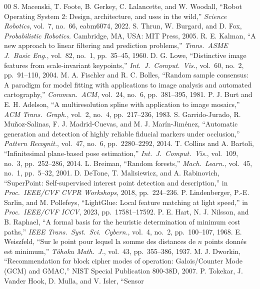 \documentclass[conference]{IEEEtran}
\begin{document}
\begin{thebibliography}{00}
 S. Macenski, T. Foote, B. Gerkey, C. Lalancette, and W. Woodall,
``Robot Operating System 2: Design, architecture, and uses in the wild,''
\emph{Science Robotics}, vol.~7, no.~66, eabm6074, 2022.
 S. Thrun, W. Burgard, and D. Fox, \emph{Probabilistic Robotics}.
Cambridge, MA, USA: MIT Press, 2005.
 R. E. Kalman, ``A new approach to linear filtering and prediction
problems,'' \emph{Trans.\ ASME J.\ Basic Eng.}, vol.~82, no.~1, pp.~35--45, 1960.
 D. G. Lowe, ``Distinctive image features from scale-invariant
keypoints,'' \emph{Int.\ J.\ Comput.\ Vis.}, vol.~60, no.~2, pp.~91--110, 2004.
 M. A. Fischler and R. C. Bolles, ``Random sample consensus: A
paradigm for model fitting with applications to image analysis and automated
cartography,'' \emph{Commun.\ ACM}, vol.~24, no.~6, pp.~381--395, 1981.
 P. J. Burt and E. H. Adelson, ``A multiresolution spline with
application to image mosaics,'' \emph{ACM Trans.\ Graph.}, vol.~2, no.~4,
pp.~217--236, 1983.
 S. Garrido-Jurado, R. Mu\~noz-Salinas, F. J. Madrid-Cuevas, and
M. J. Mar\'in-Jim\'enez, ``Automatic generation and detection of highly reliable
fiducial markers under occlusion,'' \emph{Pattern Recognit.}, vol.~47, no.~6,
pp.~2280--2292, 2014.
 T. Collins and A. Bartoli, ``Infinitesimal plane-based pose
estimation,'' \emph{Int.\ J.\ Comput.\ Vis.}, vol.~109, no.~3, pp.~252--286, 2014.
 L. Breiman, ``Random forests,'' \emph{Mach.\ Learn.}, vol.~45,
no.~1, pp.~5--32, 2001.
 D. DeTone, T. Malisiewicz, and A. Rabinovich, ``SuperPoint:
Self-supervised interest point detection and description,'' in \emph{Proc.\
IEEE/CVF CVPR Workshops}, 2018, pp.~224--236.
 P. Lindenberger, P.-E. Sarlin, and M. Pollefeys, ``LightGlue:
Local feature matching at light speed,'' in \emph{Proc.\ IEEE/CVF ICCV}, 2023,
pp.~17581--17592.
 P. E. Hart, N. J. Nilsson, and B. Raphael, ``A formal basis for
the heuristic determination of minimum cost paths,'' \emph{IEEE Trans.\ Syst.\
Sci.\ Cybern.}, vol.~4, no.~2, pp.~100--107, 1968.
\bibitem{weiszfeld} E. Weiszfeld, ``Sur le point pour lequel la somme des
distances de $n$ points donn\'es est minimum,'' \emph{T\^ohoku Math.\ J.},
vol.~43, pp.~355--386, 1937.
\bibitem{nist} M. J. Dworkin, ``Recommendation for block cipher modes of
operation: Galois/Counter Mode (GCM) and GMAC,'' NIST Special Publication
800-38D, 2007.
\bibitem{tokekar} P. Tokekar, J. Vander Hook, D. Mulla, and V. Isler, ``Sensor

\end{thebibliography}
\end{document}
